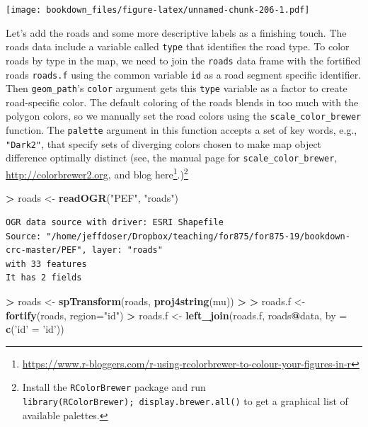 \documentclass[]{krantz}
\makeatletter
\newenvironment{Shaded}{\begin{snugshade}}{\end{snugshade}}
\newcommand{\KeywordTok}[1]{\textcolor[rgb]{0.27,0.27,0.27}{\textbf{#1}}}
\newcommand{\DataTypeTok}[1]{\textcolor[rgb]{0.27,0.27,0.27}{#1}}
\newcommand{\StringTok}[1]{\textcolor[rgb]{0.5,0.5,0.5}{#1}}
\newcommand{\OperatorTok}[1]{\textcolor[rgb]{0.43,0.43,0.43}{\textbf{#1}}}
\newcommand{\ErrorTok}[1]{\textcolor[rgb]{0.14,0.14,0.14}{\textbf{#1}}}
\newcommand{\NormalTok}[1]{#1}
\renewcommand{\href}[2]{#2\footnote{\url{#1}}}
\newenvironment{kframe}{%
\medskip{}
\setlength{\fboxsep}{.8em}
 \def\at@end@of@kframe{}%
 \ifinner\ifhmode%
  \def\at@end@of@kframe{\end{minipage}}%
  \begin{minipage}{\columnwidth}%
 \fi\fi%
 \def\FrameCommand##1{\hskip\@totalleftmargin \hskip-\fboxsep
 \colorbox{shadecolor}{##1}\hskip-\fboxsep
     \hskip-\linewidth \hskip-\@totalleftmargin \hskip\columnwidth}%
 \MakeFramed {\advance\hsize-\width
   \@totalleftmargin\z@ \linewidth\hsize
   \@setminipage}}%
 {\par\unskip\endMakeFramed%
 \at@end@of@kframe}
\renewenvironment{Shaded}{\begin{kframe}}{\end{kframe}}
\makeatother
\begin{document}
\texttt{[image: bookdown\_files/figure-latex/unnamed-chunk-206-1.pdf]}

Let's add the roads and some more descriptive labels as a finishing
touch. The roads data include a variable called \texttt{type} that
identifies the road type. To color roads by type in the map, we need to
join the \texttt{roads} data frame with the fortified roads
\texttt{roads.f} using the common variable \texttt{id} as a road segment
specific identifier. Then \texttt{geom\_path}'s \texttt{color} argument
gets this \texttt{type} variable as a factor to create road-specific
color. The default coloring of the roads blends in too much with the
polygon colors, so we manually set the road colors using the
\texttt{scale\_color\_brewer} function. The \texttt{palette} argument in
this function accepts a set of key words, e.g., \texttt{"Dark2"}, that
specify sets of diverging colors chosen to make map object difference
optimally distinct (see, the manual page for
\texttt{scale\_color\_brewer}, \url{http://colorbrewer2.org}, and blog
\href{https://www.r-bloggers.com/r-using-rcolorbrewer-to-colour-your-figures-in-r}{here}.)\footnote{Install
  the \texttt{RColorBrewer} package and run
  \texttt{library(RColorBrewer);\ display.brewer.all()} to get a
  graphical list of available palettes.}

\begin{Shaded}
\begin{Highlighting}[]
\OperatorTok{>}\StringTok{ }\NormalTok{roads <-}\StringTok{ }\KeywordTok{readOGR}\NormalTok{(}\StringTok{"PEF"}\NormalTok{, }\StringTok{"roads"}\NormalTok{)}
\end{Highlighting}
\end{Shaded}

\begin{verbatim}
OGR data source with driver: ESRI Shapefile 
Source: "/home/jeffdoser/Dropbox/teaching/for875/for875-19/bookdown-crc-master/PEF", layer: "roads"
with 33 features
It has 2 fields
\end{verbatim}

\begin{Shaded}
\begin{Highlighting}[]
\OperatorTok{>}\StringTok{ }\NormalTok{roads <-}\StringTok{ }\KeywordTok{spTransform}\NormalTok{(roads, }\KeywordTok{proj4string}\NormalTok{(mu))}
\OperatorTok{>}\StringTok{ }
\ErrorTok{>}\StringTok{ }\NormalTok{roads.f <-}\StringTok{ }\KeywordTok{fortify}\NormalTok{(roads, }\DataTypeTok{region=}\StringTok{"id"}\NormalTok{)}
\OperatorTok{>}\StringTok{ }\NormalTok{roads.f <-}\StringTok{ }\KeywordTok{left_join}\NormalTok{(roads.f, roads}\OperatorTok{@}\NormalTok{data, }\DataTypeTok{by =} \KeywordTok{c}\NormalTok{(}\StringTok{'id'}\NormalTok{ =}\StringTok{ 'id'}\NormalTok{))}
\end{Highlighting}
\end{Shaded}
\end{document}
